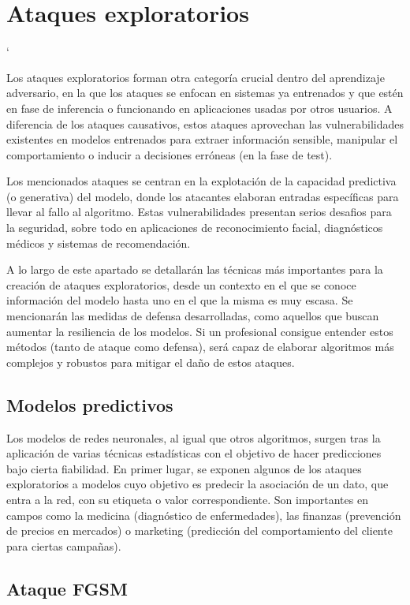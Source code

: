 \section{Ataques exploratorios}`

Los ataques exploratorios forman otra categoría crucial dentro del aprendizaje adversario, en la que los ataques se enfocan en sistemas ya entrenados y que estén en fase de inferencia o funcionando en aplicaciones usadas por otros usuarios. A diferencia de los ataques causativos, estos ataques aprovechan las vulnerabilidades existentes en modelos entrenados para extraer información sensible, manipular el comportamiento o inducir a decisiones erróneas (en la fase de test).

Los mencionados ataques se centran en la explotación de la capacidad predictiva (o generativa) del modelo, donde los atacantes elaboran entradas específicas para llevar al fallo al algoritmo. Estas vulnerabilidades presentan serios desafios para la seguridad, sobre todo en aplicaciones de reconocimiento facial, diagnósticos médicos y sistemas de recomendación.

A lo largo de este apartado se detallarán las técnicas más importantes para la creación de ataques exploratorios, desde un contexto en el que se conoce información del modelo hasta uno en el que la misma es muy escasa. Se mencionarán las medidas de defensa desarrolladas, como aquellos que buscan aumentar la resiliencia de los modelos. Si un profesional consigue entender estos métodos (tanto de ataque como defensa), será capaz de elaborar algoritmos más complejos y robustos para mitigar el daño de estos ataques.

\subsection{Modelos predictivos}

Los modelos de redes neuronales, al igual que otros algoritmos, surgen tras la aplicación de varias técnicas estadísticas con el objetivo de hacer predicciones bajo cierta fiabilidad. En primer lugar, se exponen algunos de los ataques exploratorios a modelos cuyo objetivo es predecir la asociación de un dato, que entra a la red, con su etiqueta o valor correspondiente. Son importantes en campos como la medicina (diagnóstico de enfermedades), las finanzas (prevención de precios en mercados) o marketing (predicción del comportamiento del cliente para ciertas campañas).

\subsection*{Ataque FGSM}

